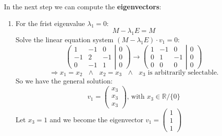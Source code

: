 \documentclass[a4paper]{article}
\begin{document}
            In the next step we can compute the \textbf{eigenvectors}:
                \begin{enumerate}
                    \item For the frist eigenvalue $\lambda_1 = 0$:\\
                            $$M - \lambda_1 E = M$$
                        Solve the linear equation system $(M - \lambda_1E) \cdot v_1 = 0$:
                            $$\left ( \begin{array}{ccc} 1 & -1 & 0 \\ -1 & 2 & -1 \\ 0 & -1 & 1 \end{array} \right | \left. \begin{array}{c} 0 \\ 0 \\ 0 \end{array}\right)
                            \rightarrow \left ( \begin{array}{ccc} 1 & -1 & 0 \\ 0 & 1 & -1 \\ 0 & 0 & 0 \end{array} \right | \left. \begin{array}{c} 0 \\ 0 \\ 0 \end{array}\right)$$
                            $$\Rightarrow x_1 = x_2\ \ \  \wedge\ \ \  x_2 = x_3\ \ \  \wedge\ \ \  x_3 \text{ is arbitrarily selectable.}$$
                        So we have the general solution:
                            $$v_1 = \left( \begin{matrix} x_3 \\ x_3 \\ x_3 \end{matrix} \right) \text{, with } x_3 \in \mathbb{R}/\{0\}$$
                        Let $x_3 = 1$ and we become the eigenvector $v_1 = \left( \begin{matrix} 1 \\ 1 \\ 1 \end{matrix} \right)$
                        

\end{enumerate}
\end{document}
